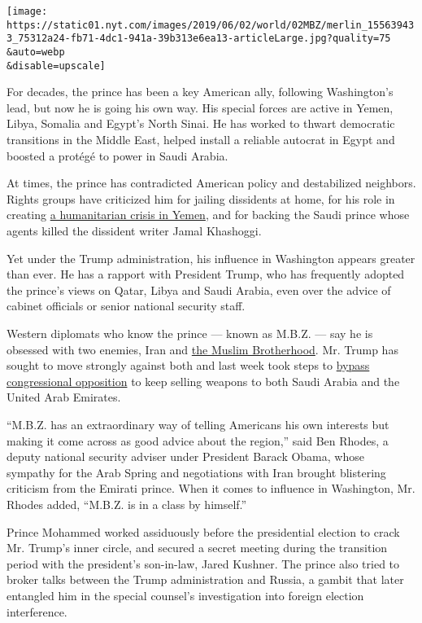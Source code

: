 \texttt{[image: https://static01.nyt.com/images/2019/06/02/world/02MBZ/merlin\_155639433\_75312a24-fb71-4dc1-941a-39b313e6ea13-articleLarge.jpg?quality=75\\\&auto=webp\\\&disable=upscale]}

For decades, the prince has been a key American ally, following
Washington's lead, but now he is going his own way. His special forces
are active in Yemen, Libya, Somalia and Egypt's North Sinai. He has
worked to thwart democratic transitions in the Middle East, helped
install a reliable autocrat in Egypt and boosted a protégé to power in
Saudi Arabia.

At times, the prince has contradicted American policy and destabilized
neighbors. Rights groups have criticized him for jailing dissidents at
home, for his role in creating
\href{https://www.nytimes.com/interactive/2018/10/26/world/middleeast/saudi-arabia-war-yemen.html}{a
humanitarian crisis in Yemen}, and for backing the Saudi prince whose
agents killed the dissident writer Jamal Khashoggi.

Yet under the Trump administration, his influence in Washington appears
greater than ever. He has a rapport with President Trump, who has
frequently adopted the prince's views on Qatar, Libya and Saudi Arabia,
even over the advice of cabinet officials or senior national security
staff.

Western diplomats who know the prince --- known as M.B.Z. --- say he is
obsessed with two enemies, Iran and
\href{https://www.nytimes.com/2019/05/10/world/middleeast/trump-muslim-brotherhood.html}{the
Muslim Brotherhood}. Mr. Trump has sought to move strongly against both
and last week took steps to
\href{https://www.nytimes.com/2019/05/23/us/politics/trump-saudi-arabia-arms-sales.html}{bypass
congressional opposition} to keep selling weapons to both Saudi Arabia
and the United Arab Emirates.

``M.B.Z. has an extraordinary way of telling Americans his own interests
but making it come across as good advice about the region,'' said Ben
Rhodes, a deputy national security adviser under President Barack Obama,
whose sympathy for the Arab Spring and negotiations with Iran brought
blistering criticism from the Emirati prince. When it comes to influence
in Washington, Mr. Rhodes added, ``M.B.Z. is in a class by himself.''

Prince Mohammed worked assiduously before the presidential election to
crack Mr. Trump's inner circle, and secured a secret meeting during the
transition period with the president's son-in-law, Jared Kushner. The
prince also tried to broker talks between the Trump administration and
Russia, a gambit that later entangled him in the special counsel's
investigation into foreign election interference.

